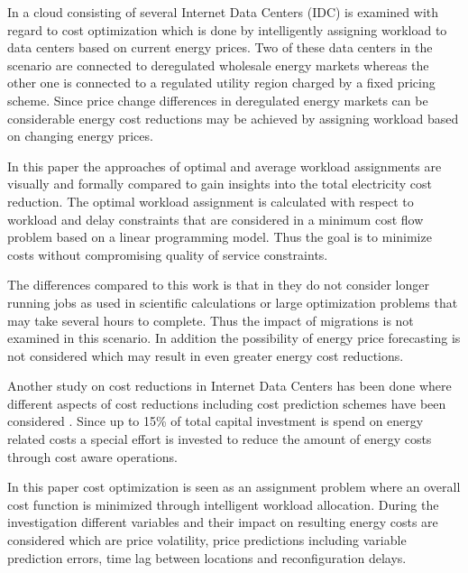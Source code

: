 In \cite{rao2010minimizing} a cloud consisting of several Internet Data Centers (IDC) is examined with regard to cost optimization which is done by intelligently assigning workload to data centers based on current energy prices. Two of these data centers in the scenario are connected to deregulated wholesale energy markets whereas the other one is connected to a regulated utility region charged by a fixed pricing scheme. Since price change differences in deregulated energy markets can be considerable energy cost reductions may be achieved by assigning workload based on changing energy prices.  %

In this paper the approaches of optimal and average workload assignments are visually and formally compared to gain insights into the total electricity cost reduction. The optimal workload assignment is calculated with respect to workload and delay constraints that are considered in a minimum cost flow problem based on a linear programming model. Thus the goal is to minimize costs without compromising quality of service constraints. 

The differences compared to this work is that in \cite{rao2010minimizing} they do not consider longer running jobs as used in scientific calculations or large optimization problems that may take several hours to complete. Thus the impact of migrations is not examined in this scenario. In addition the possibility of energy price forecasting is not considered which may result in even greater energy cost reductions. 

Another study on cost reductions in Internet Data Centers has been done where different aspects of cost reductions including cost prediction schemes have been considered \cite{de2013study}. Since up to 15\% of total capital investment is spend on energy related costs 
a special effort is invested to reduce the amount of energy costs through cost aware operations. %

In this paper cost optimization is seen as an assignment problem where an overall cost function is minimized through intelligent workload allocation. During the investigation different variables and their impact on resulting energy costs are considered which are price volatility, price predictions including variable prediction errors, time lag between locations and reconfiguration delays. 

